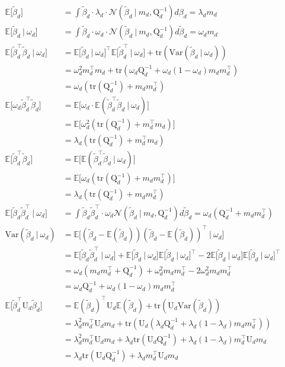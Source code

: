 \documentclass[twoside,11pt]{article}
\newcommand\given[1][]{\:#1\vert\:}
\newcommand{\transpose}[1]{#1^{\intercal}}
\newcommand{\E}{\mathbb{E}}
\newcommand{\betad}{\tilde{\beta}_d}
\newcommand{\umat}{\mathrm{U}}
\newcommand{\qmat}{\mathrm{Q}}
\newcommand{\qbeta}{\mathcal{N} \left( \betad \given m_d, \qmat_d^{-1} \right)}
\newcommand{\trace}[1]{\mathrm{tr} \left( #1 \right)}
\newcommand{\var}[1]{\mathrm{Var}\left(#1\right)}
\begin{document}
\begin{align*}
	\E \Big[ \betad \Big] &= \int \betad \cdot  \lambda_d \cdot \qbeta d\beta_d = \lambda_d m_d \\
	\E \Big[ \betad \given \omega_d \Big] &= \int  \betad \cdot \omega_d \cdot \qbeta d \betad = \omega_d m_d \\
	\E \Big[ \transpose{\betad} \betad \given \omega_d \Big] &= \transpose{\E \Big[ \betad \given \omega_d \Big]} \E \Big[ \transpose{\betad} \given \omega_d \Big] + \trace{\var{\betad \given \omega_d}} \\
	&= \omega_d^2 \transpose{m_d} m_d + \trace{\omega_d \qmat_d^{-1} + \omega_d(1 - \omega_d) m_d \transpose{m_d}} \\
	&= \omega_d \left( \trace{\qmat_d^{-1}} + m_d \transpose{m_d} \right) \\
	\E \Big[ \omega_d \transpose{\betad} \betad \Big] &= \E \Big[ \omega_d \cdot \E \left( \transpose{\betad} \betad \given \omega_d\right) \Big] \\
	&= \E \Big[ \omega_d^2 \left( \trace{\qmat_d^{-1}} + \transpose{m_d} m_d \right)\Big] \\
	&= \lambda_d \left( \trace{\qmat_d^{-1}} + \transpose{m_d} m_d\right) \\
	\E \Big[ \transpose{\betad} \betad\Big] &= \E \Big[ \E \left( \transpose{\betad} \betad \given \omega_d\right)\Big] \\
	&= \E \Big[ \omega_d \left( \trace{\qmat_d^{-1}} + m_d \transpose{m_d} \right) \Big]\\
	&= \lambda_d \left( \trace{\qmat_d^{-1}} + m_d \transpose{m_d} \right)\\
	\E \Big[ \betad \transpose{\betad} \given \omega_d \Big] &= \int \betad \transpose{\betad} \cdot \omega_d \qbeta d\betad  = \omega_d \left( \qmat_d^{-1} + m_d \transpose{m_d} \right) \\
	\var{\betad \given \omega_d} &= \E\Big[  (\betad - \E(\betad))\transpose{(\betad - \E(\betad))} \given \omega_d \Big] \\
	&= \E\Big[\betad \transpose{\betad} \given \omega_d \Big] + \E \Big[ \betad \given \omega_d \Big] \transpose{\E \Big[ \betad \given \omega_d \Big]} - 2 \E \Big[ \betad \given \omega_d \Big] \transpose{\E \Big[ \betad \given \omega_d \Big]} \\
	&= \omega_d \left( m_d \transpose{m_d} + \qmat_d^{-1} \right) + \omega_d^2 m_d \transpose{m_d} - 2\omega_d^2 m_d\transpose{m_d} \\
	&= \omega_d \qmat_d^{-1} + \omega_d(1-\omega_d) m_d \transpose{m_d} \\
	\E \Big[ \transpose{\betad} \umat_d \betad \Big] &= \transpose{\E(\betad)} \umat_d \E(\betad) + \trace{\umat_d \var{\betad}} \\
	&= \lambda_d^2 \transpose{m_d} \umat_d m_d + \trace{\umat_d \left( \lambda_d \qmat_d^{-1} + \lambda_d(1-\lambda_d)m_d \transpose{m_d} \right)} \\
	&= \lambda_d^2 \transpose{m_d} \umat_d m_d + \lambda_d \trace{\umat_d\qmat_d^{-1}} + \lambda_d(1 - \lambda_d)\transpose{m_d}\umat_dm_d \\
	&= \lambda_d \trace{\umat_d \qmat_d^{-1}} + \lambda_d \transpose{m_d} \umat_d m_d
\end{align*}
\end{document}
